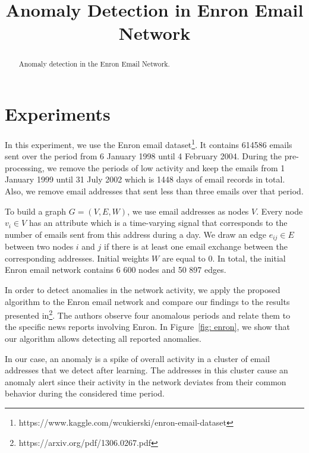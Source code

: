 \documentclass[]{article}
\title{Anomaly Detection in Enron Email Network}
\begin{document}
\maketitle

\begin{abstract}
Anomaly detection in the Enron Email Network.
\end{abstract}

\section{Experiments}
In this experiment, we use the Enron email dataset\footnote{https://www.kaggle.com/wcukierski/enron-email-dataset}. It contains 614586 emails sent over the period from 6 January 1998 until 4 February 2004. During the pre-processing, we remove the periods of low activity and keep the emails from 1 January 1999 until 31 July 2002 which is 1448 days of email records in total. Also, we remove email addresses that sent less than three emails over that period.

To build a graph \mbox{$G = (V,E,W)$}, we use email addresses as nodes $V$. Every node $v_i \in V$ has an attribute which is a time-varying signal that corresponds to the number of emails sent from this address during a day. We draw an edge $e_{ij} \in E$ between two nodes $i$ and $j$ if there is at least one email exchange between the corresponding addresses. Initial weights $W$ are equal to $0$. In total, the initial Enron email network contains 6 600 nodes and 50 897 edges.

In order to detect anomalies in the network activity, we apply the proposed algorithm to the Enron email network and compare our findings to the results presented in\footnote{https://arxiv.org/pdf/1306.0267.pdf}. The authors observe four anomalous periods and relate them to the specific news reports involving Enron. In Figure~\ref{fig: enron}, we show that our algorithm allows detecting all reported anomalies.

In our case, an anomaly is a spike of overall activity in a cluster of email addresses that we detect after learning. The addresses in this cluster cause an anomaly alert since their activity in the network deviates from their common behavior during the considered time period.
\end{document}
